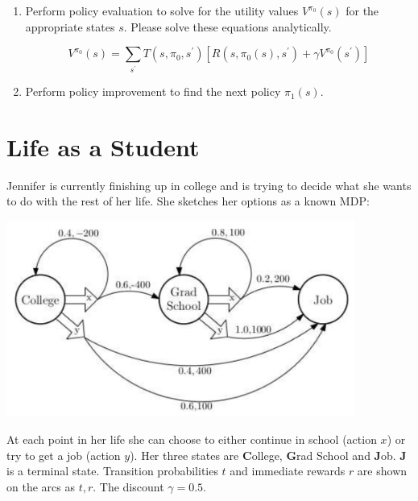 \documentclass[12pt]{article}
\begin{document}
\begin{enumerate}
\begin{enumerate}
 \item Perform policy evaluation to solve for the utility values
  $V^{\pi_0}(s)$ for the appropriate states $s$.  Please solve these
  equations analytically.

  \[
    V^{\pi_{0}}(s) = \sum_{s^{\prime}}T(s, \pi_{0}, s^{\prime})\left[ R(s, \pi_{0}(s), s^{\prime}) + \gamma V^{\pi_{0}}(s^{\prime}) \right]
  \]

  \item Perform policy improvement to find the next policy $\pi_1(s)$.

  \end{enumerate}

\end{enumerate}

\clearpage

\section{Life as a Student}

Jennifer is currently finishing up in college and is trying to decide
what she wants to do with the rest of her life.  She sketches her
options as a known MDP:

\begin{center}
\includegraphics[width=4.5in]{student_life.png}
\end{center}

At each point in her life she can choose to either continue in school
(action $x$) or try to get a job (action $y$).  Her three states are
{\bf C}ollege, {\bf G}rad School and {\bf J}ob.  {\bf J} is a terminal
state.  Transition probabilities $t$ and immediate rewards $r$ are
shown on the arcs as $t,r$.  The discount $\gamma = 0.5$.
\end{document}
